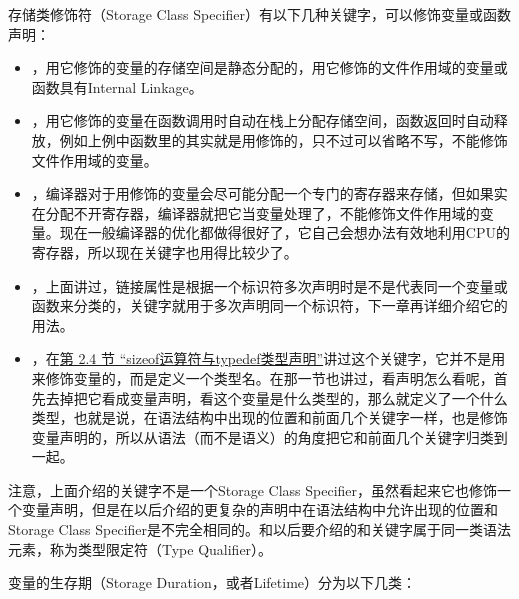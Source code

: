 存储类修饰符（Storage Class Specifier）有以下几种关键字，可以修饰变量或函数声明：


\begin{itemize}

\item {}，用它修饰的变量的存储空间是静态分配的，用它修饰的文件作用域的变量或函数具有Internal Linkage。

\item {}，用它修饰的变量在函数调用时自动在栈上分配存储空间，函数返回时自动释放，例如上例中函数里的其实就是用修饰的，只不过可以省略不写，不能修饰文件作用域的变量。

\item {}，编译器对于用修饰的变量会尽可能分配一个专门的寄存器来存储，但如果实在分配不开寄存器，编译器就把它当变量处理了，不能修饰文件作用域的变量。现在一般编译器的优化都做得很好了，它自己会想办法有效地利用CPU的寄存器，所以现在关键字也用得比较少了。

\item {}，上面讲过，链接属性是根据一个标识符多次声明时是不是代表同一个变量或函数来分类的，关键字就用于多次声明同一个标识符，下一章再详细介绍它的用法。

\item {}，在\hyperlink{db.ch16s02.id2762676}{第 2.\BookSplit{}4 节 “sizeof运算符与typedef类型声明”}讲过这个关键字，它并不是用来修饰变量的，而是定义一个类型名。在那一节也讲过，看声明怎么看呢，首先去掉把它看成变量声明，看这个变量是什么类型的，那么就定义了一个什么类型，也就是说，在语法结构中出现的位置和前面几个关键字一样，也是修饰变量声明的，所以从语法（而不是语义）的角度把它和前面几个关键字归类到一起。
\end{itemize}


注意，上面介绍的关键字不是一个Storage Class Specifier，虽然看起来它也修饰一个变量声明，但是在以后介绍的更复杂的声明中在语法结构中允许出现的位置和Storage Class Specifier是不完全相同的。和以后要介绍的和关键字属于同一类语法元素，称为类型限定符（Type Qualifier）。



变量的生存期（Storage Duration，或者Lifetime）分为以下几类：


